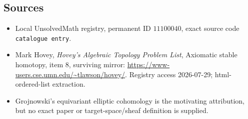 \documentclass[11pt]{article}
\begin{document}
\subsection{Sources}
\begin{itemize}
\item Local UnsolvedMath registry, permanent ID \(11100040\), exact source code \texttt{catalogue entry}.
\item Mark Hovey, \emph{Hovey's Algebraic Topology Problem List}, Axiomatic stable homotopy, item 8, surviving mirror: \url{https://www-users.cse.umn.edu/~tlawson/hovey/}. Registry access 2026-07-29; html-ordered-list extraction.
\item Grojnowski's equivariant elliptic cohomology is the motivating attribution, but no exact paper or target-space/sheaf definition is supplied.
\end{itemize}
\end{document}
